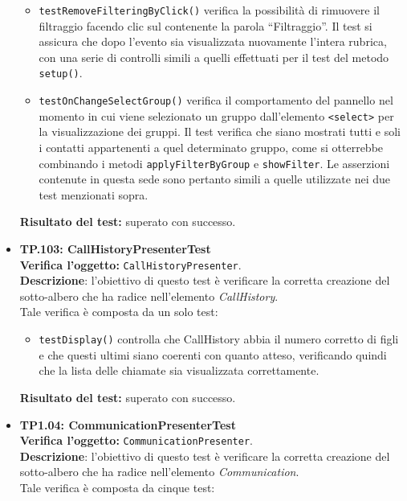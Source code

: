 \begin{itemize}
\begin{itemize}
\item \texttt{testRemoveFilteringByClick()} verifica la possibilità di rimuovere il filtraggio facendo clic sul  contenente la parola ``Filtraggio''. Il test si assicura che dopo l'evento sia visualizzata nuovamente l'intera rubrica, con una serie di controlli simili a quelli effettuati per il test del metodo \verb'setup()'.

\item \texttt{testOnChangeSelectGroup()} verifica il comportamento del pannello nel momento in cui viene selezionato un gruppo dall'elemento \verb'<select>' per la visualizzazione dei gruppi. Il test verifica che siano mostrati tutti e soli i contatti appartenenti a quel determinato gruppo, come si otterrebbe combinando i metodi \verb'applyFilterByGroup' e \verb'showFilter'. Le asserzioni contenute in questa sede sono pertanto simili a quelle utilizzate nei due test menzionati sopra.

\end{itemize}
\textbf{Risultato del test:} superato con successo.

\item \textbf{TP.103: CallHistoryPresenterTest}\\
\textbf{Verifica l'oggetto:} \texttt{CallHistoryPresenter}.\\
\textbf{Descrizione}: l'obiettivo di questo test è verificare la corretta creazione del sotto-albero che ha radice nell'elemento \textit{CallHistory}.\\
Tale verifica è composta da un solo test:
\begin{itemize}

\item \texttt{testDisplay()} controlla che CallHistory abbia il numero corretto di figli e  che questi ultimi siano coerenti con quanto atteso, verificando quindi che la lista delle chiamate sia visualizzata correttamente.

\end{itemize}
\textbf{Risultato del test:} superato con successo.

\item \textbf{TP1.04: CommunicationPresenterTest}\\ %
\textbf{Verifica l'oggetto:} \texttt{CommunicationPresenter}.\\
\textbf{Descrizione}: l'obiettivo di questo test è verificare la corretta creazione del sotto-albero che ha radice nell'elemento \textit{Communication}.\\
Tale verifica è composta da cinque test:
\begin{itemize}


\end{itemize}
\end{itemize}

